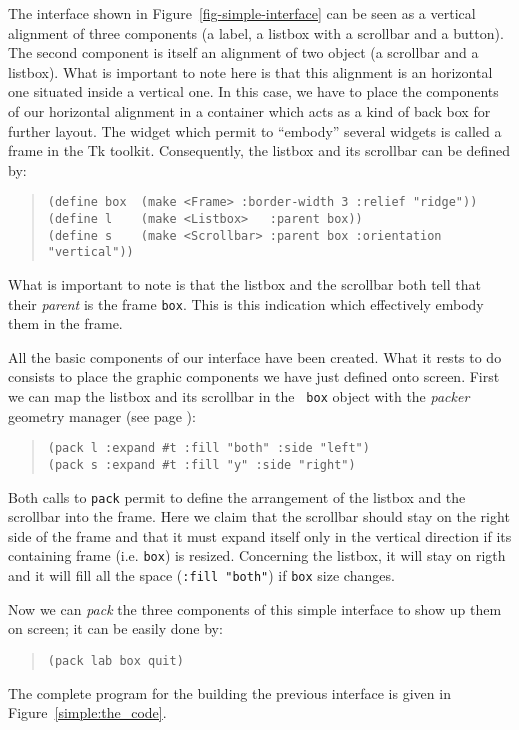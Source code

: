 The interface shown in Figure~\ref{fig-simple-interface} can be seen as a vertical alignment of
 three components (a label, a listbox with a scrollbar and a button). The
second component is itself an alignment of two object (a scrollbar and a
listbox). What is important to note here is that this alignment is an
horizontal one situated inside a vertical one. In this case, we have to place
the components of our horizontal alignment in a container which acts as a kind
of back box for further layout. The widget which permit to ``embody'' several
widgets is called a frame in the Tk toolkit. Consequently, the listbox and its
scrollbar can be defined by:
\begin{quote}
\begin{verbatim}
(define box  (make <Frame> :border-width 3 :relief "ridge"))
(define l    (make <Listbox>   :parent box))
(define s    (make <Scrollbar> :parent box :orientation "vertical"))
\end{verbatim}
\end{quote}
What is important to note is that the listbox and the scrollbar both tell that
their {\em parent} is the frame {\tt box}. This is this indication which
effectively embody them in the frame.


All the basic components of our interface have been created. What it
rests to do consists to place the graphic components we have just defined
onto screen. First we can map the listbox and its scrollbar in the {\tt
box} object with the {\em packer} geometry manager (see
page \pageref{pack-doc}):
\begin{quote}
\begin{verbatim}
(pack l :expand #t :fill "both" :side "left")
(pack s :expand #t :fill "y" :side "right")
\end{verbatim}
\end{quote}
Both calls to {\tt pack} permit to define the arrangement of the listbox
and the scrollbar into the frame. Here we claim that the scrollbar should
stay on the right side of the frame and that it must expand itself only in
the vertical direction if its containing frame (i.e. {\tt box}) is resized.
Concerning the listbox, it will stay on rigth and it will fill all the
space ({\tt :fill~"both"}) if {\tt box} size changes.

Now we can {\em pack} the three components of this simple interface to show
up them on screen; it can be easily done by:
\begin{quote}
\begin{verbatim}
(pack lab box quit)
\end{verbatim}
\end{quote}
The complete program for the building the previous interface is given in
Figure~\ref{simple:the_code}.

